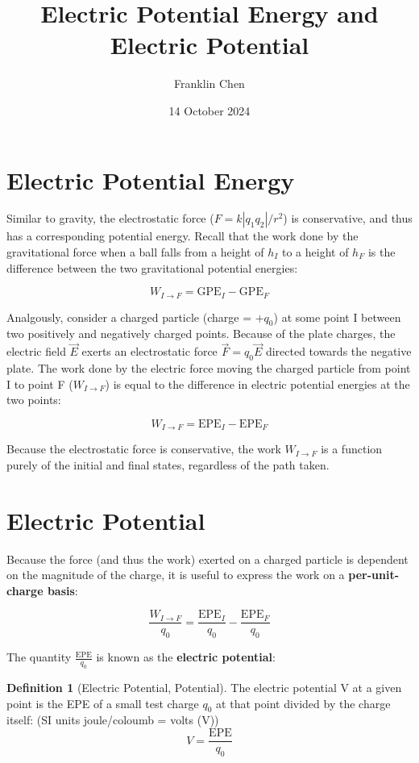 \documentclass[12pt, a4paper]{article}
\title{Electric Potential Energy and Electric Potential}
\author{Franklin Chen}
\date{14 October 2024}
\theoremstyle{definition}
\newtheorem{definition}{Definition}
\begin{document}
\maketitle
\newpage

\tableofcontents

\section{Electric Potential Energy}
Similar to gravity, the electrostatic force ($F = k|q_1 q_2|/r^2$) is conservative, and thus has a corresponding potential energy.
Recall that the work done by the gravitational force when a ball falls from a height of $h_I$ to a height of $h_F$ is the difference between the two gravitational potential energies:

\[W_{I \to F} = {\textrm{GPE}}_I - {\textrm{GPE}}_F\]

Analgously, consider a charged particle (charge = $+q_0$) at some point I between two positively and negatively charged points.
Because of the plate charges, the electric field $\vec{E}$ exerts an electrostatic force $\vec{F} = q_0\vec{E}$ directed towards the negative plate.
The work done by the electric force moving the charged particle from point I to point F ($W_{I \to F}$) is equal to the difference in electric potential energies at the two points:

\[W_{I \to F} = {\textrm{EPE}}_I - {\textrm{EPE}}_F\]

Because the electrostatic force is conservative, the work $W_{I \to F}$ is a function purely of the initial and final states, regardless of the path taken.

\section{Electric Potential}
Because the force (and thus the work) exerted on a charged particle is dependent on the magnitude of the charge, it is useful to express the work on a \textbf{per-unit-charge basis}:

\[\frac{W_{I \to F}}{q_0} = \frac{{\textrm{EPE}}_I}{q_0} - \frac{{\textrm{EPE}}_F}{q_0}\]

The quantity $\frac{\textrm{EPE}}{q_0}$ is known as the \textbf{electric potential}:

\begin{definition}[Electric Potential, Potential]
    The electric potential V at a given point is the EPE of a small test charge $q_0$ at that point divided by the charge itself:
    (SI units joule/coloumb = volts (V))
    \[V = \frac{\textrm{EPE}}{q_0}\]
\end{definition}
\end{document}
